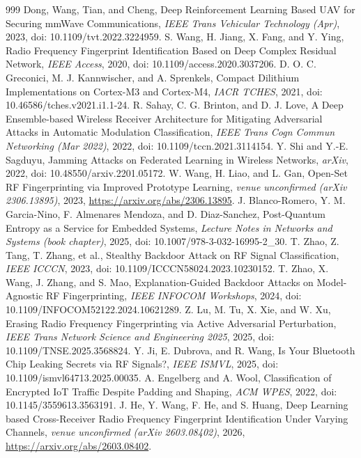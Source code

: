 \documentclass[10.5pt,compsoc,winfonts]{ICN}
\begin{document}
\begin{thebibliography}{999}
Dong, Wang, Tian, and Cheng, Deep Reinforcement Learning Based UAV for Securing mmWave Communications, \emph{IEEE Trans Vehicular Technology (Apr)}, 2023, doi: 10.1109/tvt.2022.3224959.
S. Wang, H. Jiang, X. Fang, and Y. Ying, Radio Frequency Fingerprint Identification Based on Deep Complex Residual Network, \emph{IEEE Access}, 2020, doi: 10.1109/access.2020.3037206.
D. O. C. Greconici, M. J. Kannwischer, and A. Sprenkels, Compact Dilithium Implementations on Cortex-M3 and Cortex-M4, \emph{IACR TCHES}, 2021, doi: 10.46586/tches.v2021.i1.1-24.
R. Sahay, C. G. Brinton, and D. J. Love, A Deep Ensemble-based Wireless Receiver Architecture for Mitigating Adversarial Attacks in Automatic Modulation Classification, \emph{IEEE Trans Cogn Commun Networking (Mar 2022)}, 2022, doi: 10.1109/tccn.2021.3114154.
Y. Shi and Y.-E. Sagduyu, Jamming Attacks on Federated Learning in Wireless Networks, \emph{arXiv}, 2022, doi: 10.48550/arxiv.2201.05172.
W. Wang, H. Liao, and L. Gan, Open-Set RF Fingerprinting via Improved Prototype Learning, \emph{venue unconfirmed (arXiv 2306.13895)}, 2023, \url{https://arxiv.org/abs/2306.13895}.
J. Blanco-Romero, Y. M. Garcia-Nino, F. Almenares Mendoza, and D. Diaz-Sanchez, Post-Quantum Entropy as a Service for Embedded Systems, \emph{Lecture Notes in Networks and Systems (book chapter)}, 2025, doi: 10.1007/978-3-032-16995-2\_30.
T. Zhao, Z. Tang, T. Zhang, et al., Stealthy Backdoor Attack on RF Signal Classification, \emph{IEEE ICCCN}, 2023, doi: 10.1109/ICCCN58024.2023.10230152.
T. Zhao, X. Wang, J. Zhang, and S. Mao, Explanation-Guided Backdoor Attacks on Model-Agnostic RF Fingerprinting, \emph{IEEE INFOCOM Workshops}, 2024, doi: 10.1109/INFOCOM52122.2024.10621289.
Z. Lu, M. Tu, X. Xie, and W. Xu, Erasing Radio Frequency Fingerprinting via Active Adversarial Perturbation, \emph{IEEE Trans Network Science and Engineering 2025}, 2025, doi: 10.1109/TNSE.2025.3568824.
Y. Ji, E. Dubrova, and R. Wang, Is Your Bluetooth Chip Leaking Secrets via RF Signals?, \emph{IEEE ISMVL}, 2025, doi: 10.1109/ismvl64713.2025.00035.
A. Engelberg and A. Wool, Classification of Encrypted IoT Traffic Despite Padding and Shaping, \emph{ACM WPES}, 2022, doi: 10.1145/3559613.3563191.
J. He, Y. Wang, F. He, and S. Huang, Deep Learning based Cross-Receiver Radio Frequency Fingerprint Identification Under Varying Channels, \emph{venue unconfirmed (arXiv 2603.08402)}, 2026, \url{https://arxiv.org/abs/2603.08402}.

\end{thebibliography}
\end{document}
